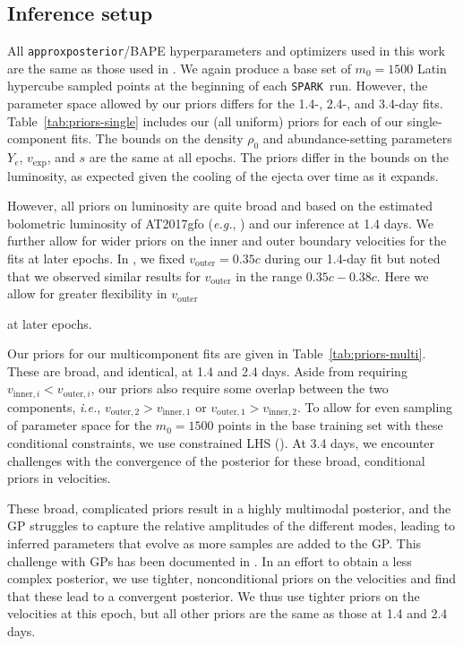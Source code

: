 \documentclass[twocolumn,twocolappendix]{aastex63}
\def\SPARK{\texttt{SPARK}}
\def\V23{\citetalias{vieira23}}
\def\eg{{\it e.g.}}
\def\ie{{\it i.e.}}
\begin{document}
{{%
\subsection{Inference setup}\label{ssc:inference-setup}

All \texttt{approxposterior}/BAPE hyperparameters and optimizers used in this work are the same as those used in \V23. We again produce a base set of $m_{0} = 1500$ Latin hypercube sampled points at the beginning of each \SPARK~run. However, the parameter space allowed by our priors differs for the 1.4-, 2.4-, and 3.4-day fits. Table~\ref{tab:priors-single} includes our (all uniform) priors for each of our single-component fits. The bounds on the density $\rho_0$ and abundance-setting parameters $Y_e$, $v_{\mathrm{exp}}$, and $s$ are the same at all epochs. The priors differ in the bounds on the luminosity, as expected given the cooling of the ejecta over time as it expands. {However, all priors on luminosity are quite broad and based on the estimated bolometric luminosity of AT2017gfo (\eg, \citealt{wu19}) and our inference at 1.4 days. We further allow for wider priors on the inner and outer boundary velocities for the fits at later epochs. In \V23, we fixed $v_{\mathrm{outer}} = 0.35c$ during our 1.4-day fit but noted that we observed similar results for $v_{\mathrm{outer}}$ in the range $0.35c - 0.38c$. Here we allow for greater flexibility in $v_{\mathrm{outer}}$ {at later epochs.
    
Our priors for our multicomponent fits are given in Table~\ref{tab:priors-multi}. These are broad, and identical, at 1.4 and 2.4 days. Aside from requiring $v_{\mathrm{inner},i} < v_{\mathrm{outer},i}$, our priors also require some overlap between the two components, \ie, $v_{\mathrm{outer},2} > v_{\mathrm{inner},1}$ or $v_{\mathrm{outer},1} > v_{\mathrm{inner},2}$. To allow for even sampling of parameter space for the $m_0 = 1500$ points in the base training set with these conditional constraints, we use constrained LHS (\citealt{petelet09}). At 3.4 days, we encounter challenges with the convergence of the posterior for these broad, conditional priors in velocities. {These broad, complicated priors result in a highly multimodal posterior, and the GP struggles to capture the relative amplitudes of the different modes, leading to inferred parameters that evolve as more samples are added to the GP. This challenge with GPs has been documented in \cite{elgammal23}. In an effort to obtain a less complex posterior, we use tighter, nonconditional priors on the velocities and find that these lead to a convergent posterior. We thus use tighter priors on the velocities at this epoch, but all other priors are the same as those at 1.4 and 2.4 days.
    
}}}}}
\end{document}
